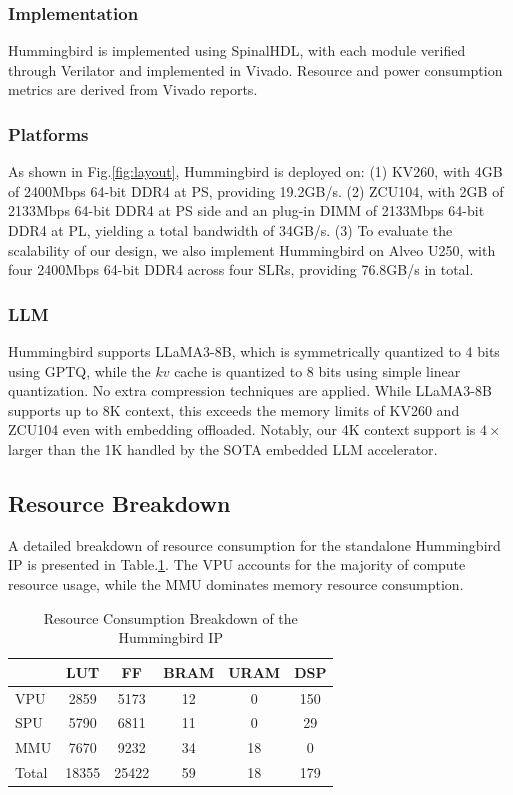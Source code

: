 \documentclass[conference]{IEEEtran}
\begin{document}
\subsubsection{Implementation}
Hummingbird is implemented using SpinalHDL\cite{spinalhdlcite}, with each module verified through Verilator\cite{snyder2004verilator} and implemented in Vivado. Resource and power consumption metrics are derived from Vivado reports.

\subsubsection{Platforms}
As shown in Fig.\ref{fig:layout}, Hummingbird is deployed on:
(1) KV260, with 4GB of 2400Mbps 64-bit DDR4 at PS, providing 19.2GB/s.
(2) ZCU104, with 2GB of 2133Mbps 64-bit DDR4 at PS side and an plug-in DIMM of 2133Mbps 64-bit DDR4 at PL, yielding a total bandwidth of 34GB/s.
(3) To evaluate the scalability of our design, we also implement Hummingbird on Alveo U250, with four 2400Mbps 64-bit DDR4 across four SLRs, providing 76.8GB/s in total.

\subsubsection{LLM}
Hummingbird supports LLaMA3-8B\cite{grattafiori2024llama3herdmodels}, which is symmetrically quantized to 4 bits using GPTQ\cite{frantar2022gptq}, while the $kv$ cache is quantized to 8 bits using simple linear quantization. No extra compression techniques are applied.
While LLaMA3-8B supports up to 8K context, this exceeds the memory limits of KV260 and ZCU104 even with embedding offloaded. Notably, our 4K context support is $4\times$ larger than the 1K handled by the SOTA embedded LLM accelerator\cite{li2025pushing}.

\subsection{Resource Breakdown}

A detailed breakdown of resource consumption for the standalone Hummingbird IP is presented in Table.\ref{tab:breakdown}. The VPU accounts for the majority of compute resource usage, while the MMU dominates memory resource consumption.

\begin{table}[H]
  \centering
  \caption{Resource Consumption Breakdown of the Hummingbird IP}
  \begin{tabular}{lccccc}
  \toprule
    & \textbf{LUT} & \textbf{FF} & \textbf{BRAM} & \textbf{URAM} & \textbf{DSP} \\
  \midrule
  VPU           & 2859   &  5173   &  12 & 0  & 150  \\
  SPU           & 5790   &  6811   &  11 & 0  & 29   \\
  MMU           & 7670   &  9232   &  34 & 18 & 0  \\
  Total         & 18355  &  25422  &  59 & 18 & 179  \\
  \bottomrule
  \end{tabular}
  \label{tab:breakdown}
  \end{table}
\end{document}
